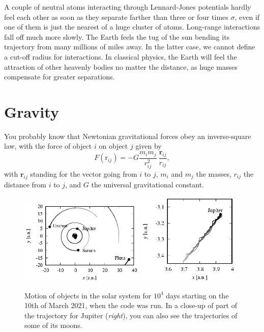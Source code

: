 A couple of neutral atoms interacting through Lennard-Jones potentials hardly 
feel each other as soon as they separate farther than three or four times 
$\sigma$, even if one of them is just the nearest of a huge cluster of atoms. 
Long-range interactions fall off much more slowly. The Earth feels the tug of 
the sun bending its trajectory from many millions of miles away. In the latter 
case, we cannot define a cut-off radius for interactions. In classical physics, 
the Earth will feel the attraction of other heavenly bodies no matter the 
distance, as huge masses compensate for greater separations.

\section{Gravity}

You probably know that Newtonian gravitational forces obey an inverse-square
law, with the force of object $i$ on object $j$ given by
\begin{equation*}
  F(\mathrm{r}_{ij}) = -G \frac{m_i m_j}{r_{ij}^2}\
                          \frac{\mathbf{r}_{ij}}{r_{ij}},
\end{equation*}
with $\mathbf{r}_{ij}$ standing for the vector going from $i$ to $j$, $m_i$ and
$m_j$ the masses, $r_{ij}$ the distance from $i$ to $j$, and $G$ the universal
gravitational constant.

\begin{figure}
  \begin{center}
  \includegraphics[width = 0.53\textwidth]{figures/gravity.eps}
  \includegraphics[width = 0.44\textwidth]{figures/Jupiter.eps}
  \end{center}
  \caption{\label{gravity}Motion of objects in the solar system for $10^4$ days 
           starting on the 10th of March 2021, when the code was run. In a 
           close-up of part of the trajectory for Jupiter (\textit{right}), you 
           can also see the trajectories of some of its moons.}
\end{figure}


